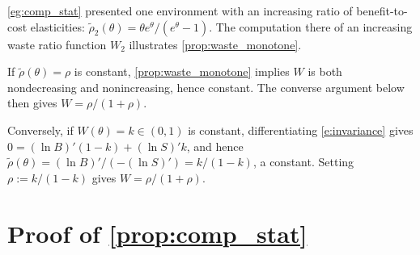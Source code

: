 \documentclass[12 pt]{article}
\makeatletter
\newenvironment{proof}[1][Proof]{\noindent\textbf{#1} }{\ \rule{0.5em}{0.5em}}
\theoremstyle{remark}
\theoremstyle{definition}
\newcommand{\elaR}{\tilde\rho}    %
\renewenvironment{proof}[1][\proofname] {\par\pushQED{\qed}\normalfont\topsep6\p@\@plus6\p@\relax\trivlist\item[\hskip\labelsep\bfseries#1\@addpunct{.}]\ignorespaces}{\popQED\endtrivlist\@endpefalse}
\makeatother
\begin{document}
\autoref{eg:comp_stat} presented one environment with an increasing ratio of benefit-to-cost elasticities: $\elaR_2(\theta) = \theta e^\theta/(e^\theta - 1)$. The computation there of an increasing waste ratio function $W_2$ illustrates \autoref{prop:waste_monotone}.

\begin{proof}[Proof of \autoref{thm:char}]
If $\elaR(\theta)=\rho$ is constant, \autoref{prop:waste_monotone} implies $W$ is both nondecreasing and nonincreasing, hence constant. The converse argument below then gives $W=\rho/(1+\rho)$. 

Conversely, if $W(\theta)=k\in (0,1)$ is constant, differentiating \autoref{e:invariance} gives $0=(\ln B)'(1-k)+(\ln S)'k$, and hence $\elaR(\theta) = (\ln B)'/(-(\ln S)') = k/(1-k)$, a constant. Setting $\rho:=k/(1-k)$ gives $W=\rho/(1+\rho)$.
\end{proof}

\section{Proof of \autoref{prop:comp_stat}} 
\label{sec:proof:compstat}
\end{document}
